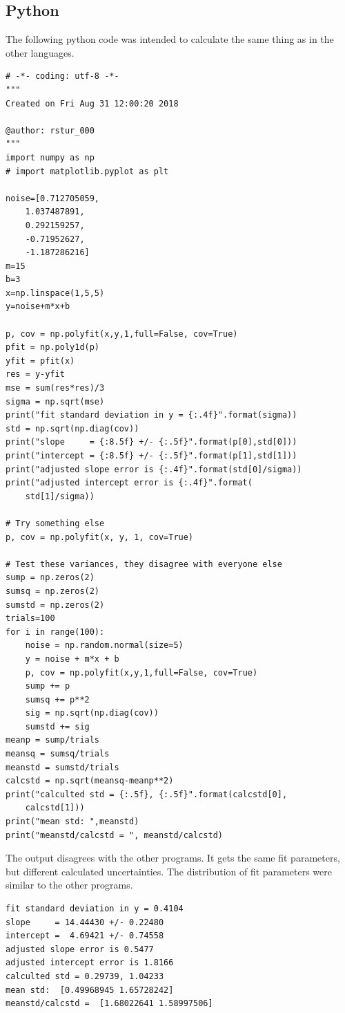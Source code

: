 \documentclass{scrartcl}
\begin{document}
\subsection{Python}
The following python code was intended to calculate the same thing
as in the other languages.
\begin{lstlisting}
# -*- coding: utf-8 -*-
"""
Created on Fri Aug 31 12:00:20 2018

@author: rstur_000
"""
import numpy as np
# import matplotlib.pyplot as plt

noise=[0.712705059,
    1.037487891,
    0.292159257,
    -0.71952627,
    -1.187286216]
m=15
b=3
x=np.linspace(1,5,5)
y=noise+m*x+b

p, cov = np.polyfit(x,y,1,full=False, cov=True)
pfit = np.poly1d(p)
yfit = pfit(x)
res = y-yfit
mse = sum(res*res)/3
sigma = np.sqrt(mse)
print("fit standard deviation in y = {:.4f}".format(sigma))
std = np.sqrt(np.diag(cov))
print("slope     = {:8.5f} +/- {:.5f}".format(p[0],std[0]))
print("intercept = {:8.5f} +/- {:.5f}".format(p[1],std[1]))
print("adjusted slope error is {:.4f}".format(std[0]/sigma))
print("adjusted intercept error is {:.4f}".format(
	std[1]/sigma))

# Try something else
p, cov = np.polyfit(x, y, 1, cov=True)

# Test these variances, they disagree with everyone else
sump = np.zeros(2)
sumsq = np.zeros(2)
sumstd = np.zeros(2)
trials=100
for i in range(100):
    noise = np.random.normal(size=5)
    y = noise + m*x + b
    p, cov = np.polyfit(x,y,1,full=False, cov=True)
    sump += p
    sumsq += p**2
    sig = np.sqrt(np.diag(cov))
    sumstd += sig
meanp = sump/trials
meansq = sumsq/trials
meanstd = sumstd/trials
calcstd = np.sqrt(meansq-meanp**2)
print("calculted std = {:.5f}, {:.5f}".format(calcstd[0],
	calcstd[1]))
print("mean std: ",meanstd)
print("meanstd/calcstd = ", meanstd/calcstd)
\end{lstlisting}
The output disagrees with the other programs. It gets the same
fit parameters, but different calculated uncertainties. The
distribution of fit parameters were similar to the other
programs.
\begin{lstlisting}
fit standard deviation in y = 0.4104
slope     = 14.44430 +/- 0.22480
intercept =  4.69421 +/- 0.74558
adjusted slope error is 0.5477
adjusted intercept error is 1.8166
calculted std = 0.29739, 1.04233
mean std:  [0.49968945 1.65728242]
meanstd/calcstd =  [1.68022641 1.58997506]
\end{lstlisting}
\end{document}
